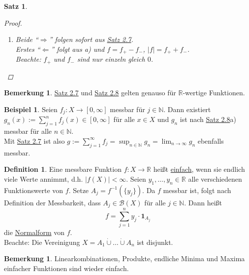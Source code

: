 \documentclass[a4paper]{scrreprt}
\newcommand{\doubleOne}{\textbf{1}}
\newcommand{\R}{\mathbb{R}}
\newcommand{\N}{\mathbb{N}}
\newcommand{\Borel}{\mathcal{B}}
\newcommand{\toInf}{\rightarrow \infty}
\newcommand{\limToInf}[1]{\lim_{#1 \toInf}}
\newcommand{\dcup}{\dot{\cup}}
\newcommand{\jlabel}[1]{\label{j_#1}}
\newcommand{\jhyperref}[2]{\hyperref[j_#1]{#2}}
\newcommand{\jlink}[1]{\jhyperref{#1}{#1}}
\newcommand{\jabb}[3]{ #1: #2 \rightarrow #3 }
\theoremstyle{plain}
\newtheorem{satz}[thm]{Satz}
\theoremstyle{definition}
\newtheorem{defn}[thm]{Definition}
\newtheorem{bem}[thm]{Bemerkung}
\newtheorem*{expl*}{Beispiel}
\newtheorem*{bem*}{Bemerkung}
\begin{document}
{{{\begin{satz}
\begin{proof}
\begin{enumerate}
                Mit \jlink{Satz 2.7} folgt dann, dass $\alpha\cdot f + \beta\cdot g$ messbar ist.\\
                (Ähnlicher Beweis für $f\cdot g$. Beachte dabei: Falls $f(x)=0,g(x)=\infty$ folgt: $f_n(x)\cdot g_n(x) = 0\cdot n = 0 \xrightarrow{n\rightarrow \infty} 0 = f(x)\cdot g(x)$.)
            \item
                Beide ``$\Rightarrow$'' folgen sofort aus \jlink{Satz 2.7}.\\
                Erstes ``$\Leftarrow$'' folgt aus a) und $f=f_+-f_-$, $|f| = f_++f_-$.\\
                Beachte: $f_+$ und $f_-$ sind nur einzeln gleich $0$.
        \end{enumerate}
    \end{proof}
\end{satz}

\begin{bem*}
    \jlink{Satz 2.7} und \jlink{Satz 2.8} gelten genauso für $\R$-wertige Funktionen.
\end{bem*}

\begin{expl*}
    Seien $\jabb{f_j}{X}{[0,\infty]}$ messbar für $j\in\N$. Dann existiert $g_n(x):= \sum_{j=1}^n f_j(x) \in [0,\infty]$ für alle $x\in X$ und $g_n$ ist nach \jlink{Satz 2.8}a) messbar für alle $n\in\N$.\\
    Mit \jlink{Satz 2.7} ist also $g := \sum_{j=1}^\infty f_j= \sup_{n\in\N}g_n = \limToInf{n} g_n$ ebenfalls messbar.
\end{expl*}

\begin{defn}
\jlabel{Def 2.9}
    Eine messbare Funktion $\jabb{f}{X}{\R}$ heißt \uline{einfach}, wenn sie endlich viele Werte annimmt, d.h. $|f(X)| < \infty$. Seien $y_1,\dots,y_n \in \R$ alle verschiedenen Funktionswerte von $f$. Setze $A_j = f^{-1}(\{y_j\})$. Da $f$ messbar ist, folgt nach Definition der Messbarkeit, dass $A_j\in\Borel(X)$ für alle $j\in\N$. Dann heißt
    \begin{displaymath}
        f = \sum_{j=1}^n y_j \cdot \doubleOne_{A_j}
    \end{displaymath}
    die \uline{Normalform} von $f$.\\
    Beachte: Die Vereinigung $X = A_1 \dcup \dots \dcup A_n$ ist disjunkt. 
\end{defn}

\begin{bem}
\jlabel{Bem 2.10}
    Linearkombinationen, Produkte, endliche Minima und Maxima einfacher Funktionen sind wieder einfach.
\end{bem}

}}}
\end{document}
